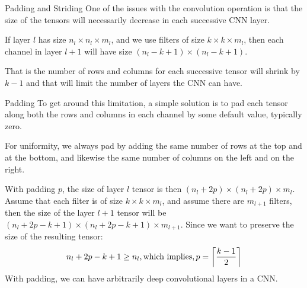 \begin{frame}{Padding and Striding}
One of the issues with the convolution operation is
that the size of the tensors will necessarily decrease in each
successive CNN layer. 

\medskip

If layer $l$ has size $n_l \times n_l \times m_l$,
and we use filters of size $k \times k \times m_l$, then each channel in
layer $l+1$ will have size $(n_l -k +1) \times (n_l -k +1)$. 

\medskip

That is the
number of rows and columns for each successive tensor will shrink by
$k-1$
and that will limit the number of layers the CNN can have. 
\end{frame}
%
\begin{frame}{Padding}
To get around
this limitation, a simple solution is to pad each tensor
along both the rows and columns in each channel by some default value, 
typically zero. 

\medskip

For
uniformity, we always pad by adding the same number of rows at the top
and at
the bottom, and likewise the same number of columns on the left and on the right.


\medskip

With padding $p$, the size of layer $l$ tensor is then $(n_l+2p) \times
(n_l+2p) \times m_l$. Assume that each filter is of size $k \times k \times
m_l$, and assume there are $m_{l+1}$ filters, then the size of the layer $l+1$ tensor will be
$(n_l+2p -k +1) \times (n_l+2p -k +1) \times m_{l+1}$. Since we want to
preserve the size of the resulting tensor:
\begin{align*}
    n_l+2p -k +1  \ge n_l, \text{which implies}, 
    p = \left\lceil \frac{k-1}{2} \right\rceil
\end{align*}
With padding, we can have arbitrarily
deep convolutional layers in a CNN.
\end{frame}
%
%
